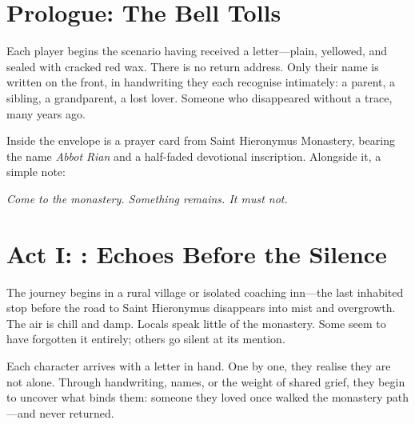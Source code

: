 \documentclass[nodeprecatedcode,bg=print]{dndbook}
\begin{document}
\large

\section*{Prologue: The Bell Tolls}
\begin{paracol}{2}
    Each player begins the scenario having received a letter—plain, yellowed, and sealed with cracked red wax. There is no return address. Only their name is written on the front, in handwriting they each recognise intimately: a parent, a sibling, a grandparent, a lost lover. Someone who disappeared without a trace, many years ago.

    \switchcolumn

    Inside the envelope is a prayer card from Saint Hieronymus Monastery, bearing the name \emph{Abbot Rian} and a half-faded devotional inscription. Alongside it, a simple note:

    \begin{Example}{}
    \textit{Come to the monastery. Something remains. It must not.}
    \end{Example}
\end{paracol}

\vspace{\baselineskip}
\section*{Act I: : Echoes Before the Silence}
\begin{paracol}{2}
    The journey begins in a rural village or isolated coaching inn—the last inhabited stop before the road to Saint Hieronymus disappears into mist and overgrowth. The air is chill and damp. Locals speak little of the monastery. Some seem to have forgotten it entirely; others go silent at its mention.

    \switchcolumn
    Each character arrives with a letter in hand. One by one, they realise they are not alone. Through handwriting, names, or the weight of shared grief, they begin to uncover what binds them: someone they loved once walked the monastery path—and never returned.
\end{paracol}
\end{document}
